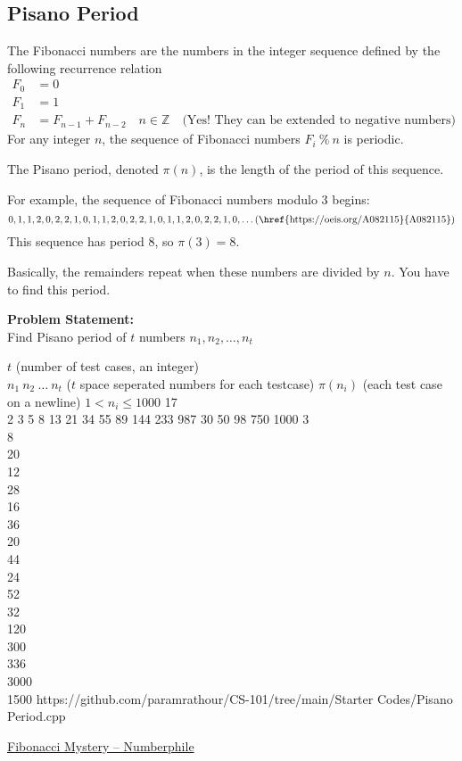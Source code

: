\subsection{Pisano Period}
The Fibonacci numbers are the numbers in the integer sequence defined by the following recurrence relation
\begin{equation}
	\begin{aligned}
		F_0 &= 0\\
		F_1 &= 1 \\
		F_n &= F_{n-1} + F_{n-2}\quad n \in \mathbb{Z}\quad\text{(Yes! They can be extended to negative numbers)}
	\end{aligned}
\end{equation}
For any integer $n$, the sequence of Fibonacci numbers $F_i \ \%\ n$ is periodic.

The Pisano period, denoted $\pi(n)$, is the length of the period of this sequence.

For example, the sequence of Fibonacci numbers modulo 3 begins:
\begin{equation*}
	0, 1, 1, 2, 0, 2, 2, 1, 0, 1, 1, 2, 0, 2, 2, 1, 0, 1, 1, 2, 0, 2, 2, 1, 0,\ldots\text{(\href{https://oeis.org/A082115}{A082115})}
\end{equation*}
This sequence has period 8, so $\pi(3) = 8$.

Basically, the remainders repeat when these numbers are divided by $n$. You have to find this period.

\textbf{Problem Statement:}\\
Find Pisano period of $t$ numbers $n_1,n_2,\ldots,n_t$
\begin{testcases}
	{$t$ \hfill(number of test cases, an integer)\\
	$n_1\ n_2\ \ldots\ n_t$ \hfill($t$ space seperated numbers for each testcase)}
	{$\pi(n_i)$ \hfill(each test case on a newline)}
	{$1 < n_i \leq 1000$}
	{17\\2 3 5 8 13 21 34 55 89 144 233 987 30 50 98 750 1000}
	{3\\8\\20\\12\\28\\16\\36\\20\\44\\24\\52\\32\\120\\300\\336\\3000\\1500}
	{https://github.com/paramrathour/CS-101/tree/main/Starter Codes/Pisano Period.cpp}
\end{testcases}
\begin{funvideo}
\href{https://youtu.be/Nu-lW-Ifyec}{Fibonacci Mystery -- Numberphile}
\end{funvideo}
